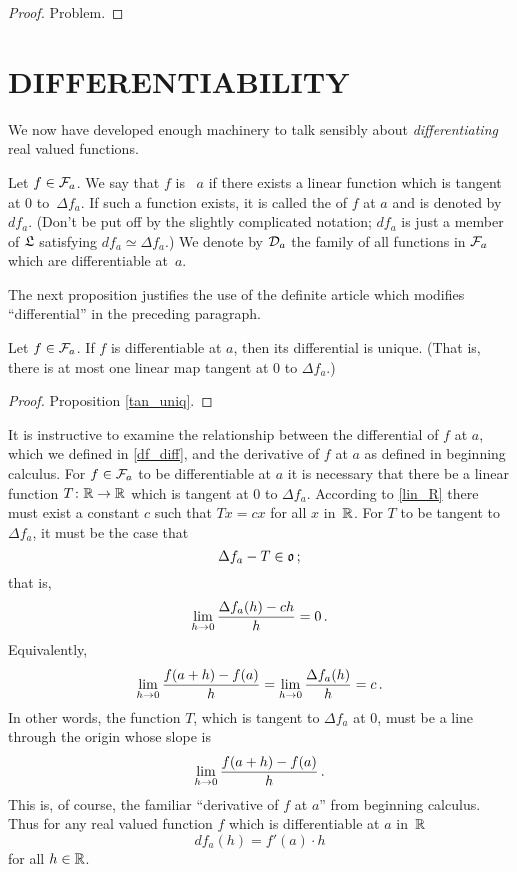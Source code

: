 \begin{proof} Problem.  \ns  \end{proof}






\section{DIFFERENTIABILITY}
We now have developed enough machinery to talk sensibly about \emph{differentiating} real
valued functions.

\begin{defn}\label{df_diff} Let $f \in \mathcal{F}_a$.  We say that $f$ is
~$a$ if there exists a linear function which is tangent at $0$
to~$\Delta f_a$.  If such a function exists, it is called the
 of $f$ at $a$ and is denoted
by~$df_a$. (Don't be put off by the slightly complicated notation; $df_a$ is just a
member of $\mathfrak{L}$ satisfying $df_a \simeq \Delta f_a$.)  We denote by $\mathcal{D}_a$ the
family of all functions in $\mathcal{F}_a$ which are differentiable at~$a$.
\end{defn}

The next proposition justifies the use of the definite article which modifies ``differential''
in the preceding paragraph.

\begin{prop}\label{diff_uniq} Let $f \in \mathcal{F}_a$. If $f$ is differentiable at $a$, then its
differential is unique. (That is, there is at most one linear map tangent at $0$ to $\Delta
f_a$.)
\end{prop}

\begin{proof} Proposition \ref{tan_uniq}.  \end{proof}

\begin{exam}\label{deriv} It is instructive to examine the relationship between the differential
of $f$ at $a$, which we defined in \ref{df_diff}, and the derivative of $f$ at $a$ as defined
in beginning calculus.  For $f \in \mathcal{F}_a$ to be differentiable at $a$ it is necessary that
there be a linear function $T \colon \mathbb{R} \rightarrow \mathbb{R}$ which is tangent at $0$ to $\Delta f_a$.
According to \ref{lin_R} there must exist a constant $c$ such that $Tx = cx$ for all $x$
in~$\mathbb{R}$.  For $T$ to be tangent to $\Delta f_a$, it must be the case that
  \[ \Delta f_a - T \in \mathfrak{o}\,; \]
that is,
  \[ \lim_{h \rightarrow 0}\frac{\Delta f_a(h) - ch}h = 0\,. \]
Equivalently,
   \[ \lim_{h \rightarrow 0}\frac{f(a+h) - f(a)}h
              = \lim_{h \rightarrow 0}\frac{\Delta f_a(h)}h = c\,. \]
In other words, the function $T$, which is tangent to $\Delta f_a$ at $0$, must be a line
through the origin whose slope is
   \[ \lim_{h \rightarrow 0}\frac{f(a + h) - f(a)}h\,. \]
This is, of course, the familiar ``derivative of $f$ at $a$'' from beginning calculus.  Thus
for any real valued function $f$ which is differentiable at $a$ in~$\mathbb{R}$
   \[ df_a(h) = f'(a)\cdot h \]
for all $h \in \mathbb{R}$.
\end{exam}

